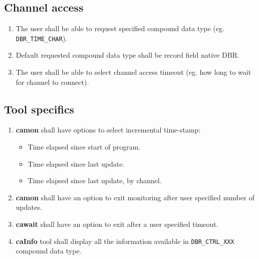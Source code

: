 \documentclass[12pt,a4paper]{article}
\begin{document}
\subsection{Channel access}
\begin{enumerate}
	\item The user shall be able to request specified compound data type (eg. \texttt{DBR\_TIME\_CHAR}).
	\item Default requested compound data type shall be record field native DBR.
	\item The user shall be able to select channel access timeout (eg. how long to wait for channel to connect).
\end{enumerate}

\subsection{Tool specifics}
\begin{enumerate}
	\item \textbf{camon} shall have options to select incremental time-stamp:
	\begin{itemize}
		\item Time elapsed since start of program.
		\item Time elapsed since last update.
		\item Time elapsed since last update, by channel.
	\end{itemize}
	\item \textbf{camon} shall have an option to exit monitoring after user specified number of updates.
	\item \textbf{cawait} shall have an option to exit after a user specified timeout.
	\item \textbf{caInfo} tool shall display all the information available in \texttt{DBR\_CTRL\_XXX} compound data type.
\end{enumerate}
\end{document}
